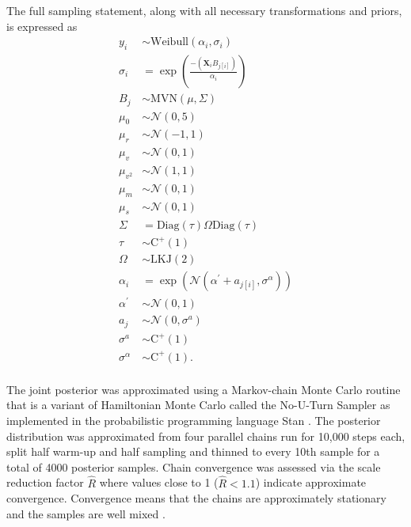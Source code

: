 \documentclass{article}
\begin{document}
The full sampling statement, along with all necessary transformations and priors, is expressed as
\begin{equation}
  \begin{aligned}
    y_{i} &\sim \mathrm{Weibull}(\alpha_{i}, \sigma_{i}) \\
    \sigma_{i} &= \exp\left(\frac{-(\mathbf{X}_{i} B_{j[i]})}{\alpha_{i}}\right) \\
    B_{j} &\sim \mathrm{MVN}(\mu, \Sigma) \\
    \mu_{0} &\sim \mathcal{N}(0, 5) \\
    \mu_{r} &\sim \mathcal{N}(-1, 1) \\
    \mu_{v} &\sim \mathcal{N}(0, 1) \\
    \mu_{v^{2}} &\sim \mathcal{N}(1, 1) \\
    \mu_{m} &\sim \mathcal{N}(0, 1) \\
    \mu_{s} &\sim \mathcal{N}(0, 1) \\
    \Sigma &= \text{Diag}(\tau) \Omega \text{Diag}(\tau) \\
    \tau &\sim \mathrm{C^{+}}(1) \\
    \Omega &\sim \text{LKJ}(2) \\
    \alpha_{i} &= \exp\left(\mathcal{N}(\alpha^{\prime} + a_{j[i]}, \sigma^{\alpha})\right) \\
    \alpha^{\prime} &\sim \mathcal{N}(0, 1) \\
    a_{j} &\sim \mathcal{N}(0, \sigma^{a}) \\
    \sigma^{a} &\sim \mathrm{C^{+}}(1) \\
    \sigma^{\alpha} &\sim \mathrm{C^{+}}(1). \\
  \end{aligned}
  \label{eq:wei_total}
\end{equation}

The joint posterior was approximated using a Markov-chain Monte Carlo routine that is a variant of Hamiltonian Monte Carlo called the No-U-Turn Sampler \citep{Hoffman2014} as implemented in the probabilistic programming language Stan \citep{2014stan}. The posterior distribution was approximated from four parallel chains run for 10,000 steps each, split half warm-up and half sampling and thinned to every 10th sample for a total of 4000 posterior samples. Chain convergence was assessed via the scale reduction factor \(\hat{R}\) where values close to 1 (\(\hat{R} < 1.1\)) indicate approximate convergence. Convergence means that the chains are approximately stationary and the samples are well mixed \citep{Gelman2013d}.
\end{document}
